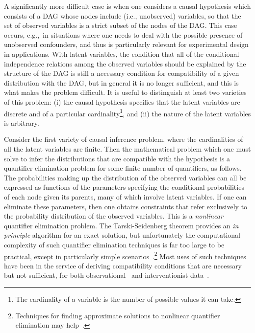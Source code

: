 \documentclass[aps,english,10pt,superscriptaddress,onecolumn,twoside,longbibliography,pra,floatfix,fleqn,nofootinbib]{revtex4-1}%
\newcommand*{\tblue}[1]{{\color{MidnightBlue}{\textbf{#1}}}}
\theoremstyle{definition}
\begin{document}
A significantly more difficult case is when one considers a causal hypothesis which consists of a DAG whose nodes include \tblue{latent} (i.e., unobserved) variables, so that the set of observed variables is a strict subset of the nodes of the DAG. This case occurs, e.g.,~in situations where one needs to deal with the possible presence of unobserved confounders, and thus is particularly relevant for experimental design in applications. With latent variables, the condition that all of the conditional independence relations among the observed variables should be explained by the structure of the DAG is still a necessary condition for compatibility of a given distribution with the DAG, but in general it is no longer sufficient, and this is what makes the problem difficult. It is useful to distinguish at least two varieties of this problem: (i) the causal hypothesis specifies that the latent variables are discrete and of a particular cardinality\footnote{The cardinality of a variable is the number of possible values it can take.}, and (ii) the nature of the latent variables is arbitrary.  

Consider the first variety of causal inference problem, where the cardinalities of all the latent variables are finite. Then the mathematical problem which one must solve to infer the distributions that are compatible with the hypothesis is a quantifier elimination problem for some finite number of quantifiers, as follows. The probabilities making up the distribution of the observed variables can all be expressed as functions of the parameters specifying the conditional probabilities of each node given its parents, many of which involve latent variables. If one can eliminate these 
parameters, then one obtains constraints that refer exclusively to the probability distribution of the observed variables.  This is a {\em nonlinear} quantifier elimination problem. The Tarski-Seidenberg theorem provides an \emph{in principle} algorithm for an exact solution, but unfortunately the computational complexity of such quantifier elimination techniques is far too large to be practical, except in particularly simple scenarios~\cite{Geiger-Meek,LeeSpekkens}.\footnote{Techniques for finding approximate solutions to nonlinear quantifier elimination may help~\cite{ChavesPolynomial}.}  Most uses of such techniques have been in the service of deriving compatibility conditions that are necessary but not sufficient, for both observational~\cite{Geiger-Meek99, Garcia2, Garcia, SSG} and interventionist data~\cite{In1, intervension1, intervension2}.
\end{document}
